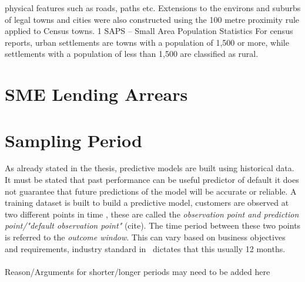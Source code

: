 physical features such as roads,  paths etc.  Extensions to the environs and suburbs of legal towns and cities were also constructed using the 100 metre proximity  rule applied to Census towns.  1 SAPS – Small Area Population Statistics  For census reports, urban settlements are towns with a population of 1,500 or more, while settlements with a population  of less than 1,500 are classified as rural.

\section{SME Lending Arrears}

\section{Sampling Period}
As already stated in the thesis, predictive models are built using historical data. It must be stated that past performance can be useful predictor of default it does not guarantee that future predictions of the model will be accurate or reliable. A training dataset is built to build a predictive model, customers are observed at two different points in time \citep{martens_credit_2010}, these are called the \textit{observation point and prediction point/"default observation point"} (cite). The time period between these two points is referred to the \textit{outcome window}. This can vary based on business objectives and requirements, industry standard in \subjectname\ dictates that this usually 12 months. \\\\

Reason/Arguments for shorter/longer periods may need to be added here \\

